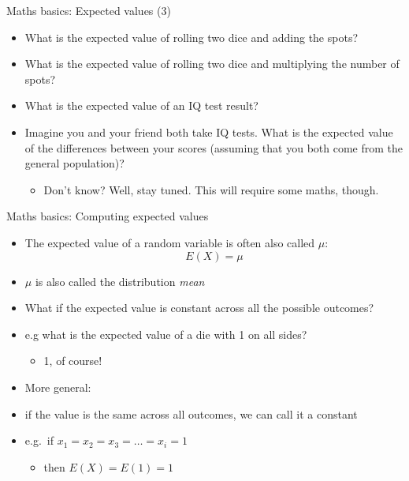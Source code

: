 \begin{frame}{Maths basics: Expected values (3)}

\begin{itemize}
\itemsep1pt\parskip0pt
\item
  What is the expected value of rolling two dice and adding the spots?
\item
  What is the expected value of rolling two dice and multiplying the
  number of spots?
\item
  What is the expected value of an IQ test result?
\item
  Imagine you and your friend both take IQ tests. What is the expected
  value of the differences between your scores (assuming that you both
  come from the general population)?

  \begin{itemize}
  \itemsep1pt\parskip0pt
  \item
    Don't know? Well, stay tuned. This will require some maths, though.
  \end{itemize}
\end{itemize}

\end{frame}

\begin{frame}{Maths basics: Computing expected values}

\begin{itemize}
\itemsep1pt\parskip0pt
\item
  The expected value of a random variable is often also called \(\mu\):
  \[E(X) = \mu\]
\item
  \(\mu\) is also called the distribution \emph{mean}
\item
  What if the expected value is constant across all the possible
  outcomes?
\item
  e.g what is the expected value of a die with 1 on all sides?

  \begin{itemize}
  \itemsep1pt\parskip0pt
  \item
    1, of course!
  \end{itemize}
\item
  More general:
\item
  if the value is the same across all outcomes, we can call it a
  constant
\item
  e.g.~if \(x_1 = x_2 = x_3 = \dots = x_i = 1\)

  \begin{itemize}
  \itemsep1pt\parskip0pt
  \item
    then \(E(X) = E(1) = 1\)
  \end{itemize}
\end{itemize}

\end{frame}

